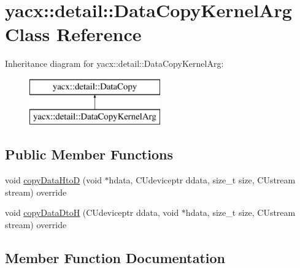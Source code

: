 \hypertarget{classyacx_1_1detail_1_1_data_copy_kernel_arg}{}\section{yacx\+:\+:detail\+:\+:Data\+Copy\+Kernel\+Arg Class Reference}
\label{classyacx_1_1detail_1_1_data_copy_kernel_arg}
Inheritance diagram for yacx\+:\+:detail\+:\+:Data\+Copy\+Kernel\+Arg\+:\begin{figure}[H]
\begin{center}
\leavevmode
\includegraphics[height=2.000000cm]{classyacx_1_1detail_1_1_data_copy_kernel_arg}
\end{center}
\end{figure}
\subsection*{Public Member Functions}
\begin{DoxyCompactItemize}
\item 
void \hyperlink{classyacx_1_1detail_1_1_data_copy_kernel_arg_a0cf2b2af95ca2c01b1a221a14a95e558}{copy\+Data\+HtoD} (void $\ast$hdata, C\+Udeviceptr ddata, size\+\_\+t size, C\+Ustream stream) override
\item 
void \hyperlink{classyacx_1_1detail_1_1_data_copy_kernel_arg_a1a6b70eea2dde6b360a1af77414dfa9f}{copy\+Data\+DtoH} (C\+Udeviceptr ddata, void $\ast$hdata, size\+\_\+t size, C\+Ustream stream) override
\end{DoxyCompactItemize}


\subsection{Member Function Documentation}
\mbox{\label{classyacx_1_1detail_1_1_data_copy_kernel_arg_a1a6b70eea2dde6b360a1af77414dfa9f}} 
